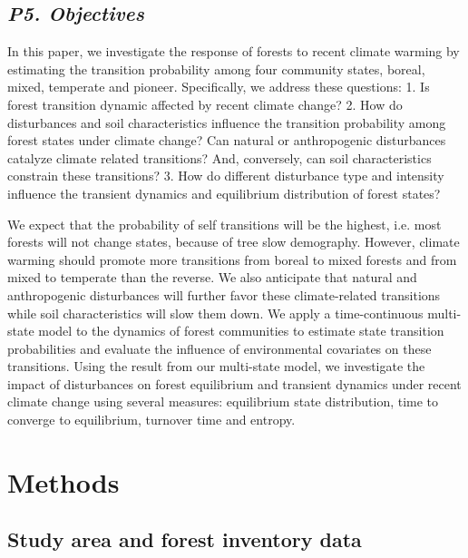 \documentclass[a4paperpaper,]{article}
\begin{document}
\hypertarget{p5.-objectives}{%
\subsection{\texorpdfstring{\emph{P5.
Objectives}}{P5. Objectives}}\label{p5.-objectives}}

In this paper, we investigate the response of forests to recent climate
warming by estimating the transition probability among four community
states, boreal, mixed, temperate and pioneer. Specifically, we address
these questions: 1. Is forest transition dynamic affected by recent
climate change? 2. How do disturbances and soil characteristics
influence the transition probability among forest states under climate
change? Can natural or anthropogenic disturbances catalyze climate
related transitions? And, conversely, can soil characteristics constrain
these transitions? 3. How do different disturbance type and intensity
influence the transient dynamics and equilibrium distribution of forest
states?

We expect that the probability of self transitions will be the highest,
i.e. most forests will not change states, because of tree slow
demography. However, climate warming should promote more transitions
from boreal to mixed forests and from mixed to temperate than the
reverse. We also anticipate that natural and anthropogenic disturbances
will further favor these climate-related transitions while soil
characteristics will slow them down. We apply a time-continuous
multi-state model to the dynamics of forest communities to estimate
state transition probabilities and evaluate the influence of
environmental covariates on these transitions. Using the result from our
multi-state model, we investigate the impact of disturbances on forest
equilibrium and transient dynamics under recent climate change using
several measures: equilibrium state distribution, time to converge to
equilibrium, turnover time and entropy.

\hypertarget{methods}{%
\section{Methods}\label{methods}}

\hypertarget{study-area-and-forest-inventory-data}{%
\subsection{Study area and forest inventory
data}\label{study-area-and-forest-inventory-data}}
\end{document}

